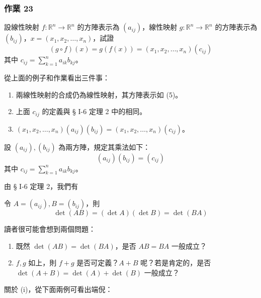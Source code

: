 \subsubsection*{作業 23}\label{hw:b6-1-23}
設線性映射 $f: \mathbb{R}^n \longrightarrow \mathbb{R}^n$ 的方陣表示為 $(a_{ij})$，線性映射 $g: \mathbb{R}^n \longrightarrow \mathbb{R}^n$ 的方陣表示為 $(b_{ij})$，$x=(x_1, x_2, \dots, x_n)$，試證
\begin{equation}
(g \circ f)(x) = g(f(x)) = (x_1, x_2, \dots, x_n)(c_{ij}) \label{eq:b6-1-7-5}
\end{equation}
其中 $c_{ij} = \sum_{k=1}^n a_{ik} b_{kj}$。

從上面的例子和作業看出三件事：
\begin{enumerate}[label=(\roman*), leftmargin=2em]
  \item 兩線性映射的合成仍為線性映射，其方陣表示如 (5)。
  \item 上面 $c_{ij}$ 的定義與 § I-6 定理 2 中的相同。
  \item $(x_1, x_2, \dots, x_n)(a_{ij})(b_{ij}) = (x_1, x_2, \dots, x_n)(c_{ij})$。
\end{enumerate}

\begin{definition*}\label{def:b6-1-9}
設 $(a_{ij}), (b_{ij})$ 為兩方陣，規定其乘法如下：
\begin{equation}
(a_{ij})(b_{ij}) = (c_{ij}) \label{eq:b6-1-7-6}
\end{equation}
其中 $c_{ij} = \sum_{k=1}^n a_{ik} b_{kj}$。
\end{definition*}

由 § I-6 定理 2，我們有

\begin{prop}\label{prop:b6-1-1}
令 $A=(a_{ij}), B=(b_{ij})$，則
\[ \det(AB) = (\det A)(\det B) = \det(BA) \]
\end{prop}

讀者很可能會想到兩個問題：
\begin{enumerate}[label=(\roman*), leftmargin=2em]
  \item 既然 $\det(AB) = \det(BA)$，是否 $AB=BA$ 一般成立？
  \item $f, g$ 如上，則 $f+g$ 是否可定義？$A+B$ 呢？若是肯定的，是否 $\det(A+B) = \det(A) + \det(B)$ 一般成立？
\end{enumerate}

關於 (i)，從下面兩例可看出端倪：


